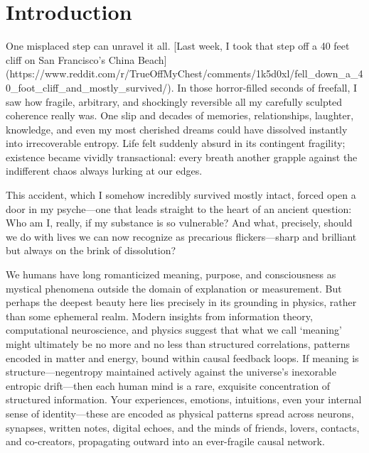\section{Introduction}
One misplaced step can unravel it all. [Last week, I took that step off a 40 feet cliff on San Francisco's China Beach](https://www.reddit.com/r/TrueOffMyChest/comments/1k5d0xl/fell_down_a_40_foot_cliff_and_mostly_survived/). In those horror-filled seconds of freefall, I saw how fragile, arbitrary, and shockingly reversible all my carefully sculpted coherence really was. One slip and decades of memories, relationships, laughter, knowledge, and even my most cherished dreams could have dissolved instantly into irrecoverable entropy. Life felt suddenly absurd in its contingent fragility; existence became vividly transactional: every breath another grapple against the indifferent chaos always lurking at our edges.

This accident, which I somehow incredibly survived mostly intact, forced open a door in my psyche---one that leads straight to the heart of an ancient question: Who am I, really, if my substance is so vulnerable? And what, precisely, should we do with lives we can now recognize as precarious flickers---sharp and brilliant but always on the brink of dissolution?

We humans have long romanticized meaning, purpose, and consciousness as mystical phenomena outside the domain of explanation or measurement. But perhaps the deepest beauty here lies precisely in its grounding in physics, rather than some ephemeral realm. Modern insights from information theory, computational neuroscience, and physics suggest that what we call `meaning' might ultimately be no more and no less than structured correlations, patterns encoded in matter and energy, bound within causal feedback loops. If meaning is structure---negentropy maintained actively against the universe's inexorable entropic drift---then each human mind is a rare, exquisite concentration of structured information. Your experiences, emotions, intuitions, even your internal sense of identity---these are encoded as physical patterns spread across neurons, synapses, written notes, digital echoes, and the minds of friends, lovers, contacts, and co-creators, propagating outward into an ever-fragile causal network. 